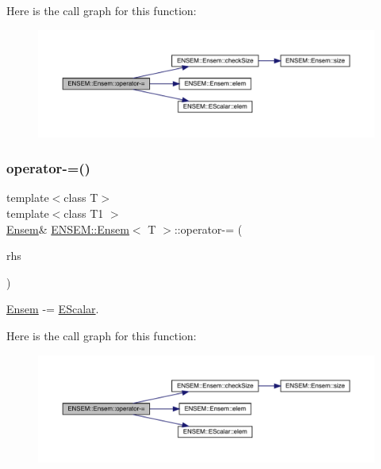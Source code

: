 Here is the call graph for this function\+:
\nopagebreak
\begin{figure}[H]
\begin{center}
\leavevmode
\includegraphics[width=350pt]{d7/d3e/classENSEM_1_1Ensem_a33710df08404883ee7790d2b67542971_cgraph}
\end{center}
\end{figure}
\mbox{\label{classENSEM_1_1Ensem_a33710df08404883ee7790d2b67542971}} 
\subsubsection{\texorpdfstring{operator-\/=()}{operator-=()}\hspace{0.1cm}{\footnotesize\ttfamily [3/6]}}
{\footnotesize\ttfamily template$<$class T$>$ \\
template$<$class T1 $>$ \\
\mbox{\hyperlink{classENSEM_1_1Ensem}{Ensem}}\& \mbox{\hyperlink{classENSEM_1_1Ensem}{E\+N\+S\+E\+M\+::\+Ensem}}$<$ T $>$\+::operator-\/= (\begin{DoxyParamCaption}\item[{const \mbox{\hyperlink{classENSEM_1_1EScalar}{E\+Scalar}}$<$ T1 $>$ \&}]{rhs }\end{DoxyParamCaption})\hspace{0.3cm}{\ttfamily [inline]}}



\mbox{\hyperlink{classENSEM_1_1Ensem}{Ensem}} -\/= \mbox{\hyperlink{classENSEM_1_1EScalar}{E\+Scalar}}. 

Here is the call graph for this function\+:
\nopagebreak
\begin{figure}[H]
\begin{center}
\leavevmode
\includegraphics[width=350pt]{d7/d3e/classENSEM_1_1Ensem_a33710df08404883ee7790d2b67542971_cgraph}
\end{center}
\end{figure}
\mbox{\label{classENSEM_1_1Ensem_ae3f3e36d96a4600e56c2b139e7897186}} 
